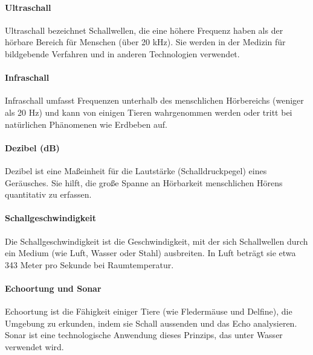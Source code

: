 \documentclass{vorlage-design-main}
\begin{document}
\hypertarget{ultraschall}{%
\paragraph{Ultraschall}\label{ultraschall}}

Ultraschall bezeichnet Schallwellen, die eine höhere Frequenz haben als
der hörbare Bereich für Menschen (über 20 kHz). Sie werden in der
Medizin für bildgebende Verfahren und in anderen Technologien verwendet.

\hypertarget{infraschall}{%
\paragraph{Infraschall}\label{infraschall}}

Infraschall umfasst Frequenzen unterhalb des menschlichen Hörbereichs
(weniger als 20 Hz) und kann von einigen Tieren wahrgenommen werden oder
tritt bei natürlichen Phänomenen wie Erdbeben auf.

\hypertarget{dezibel-db}{%
\paragraph{Dezibel (dB)}\label{dezibel-db}}

Dezibel ist eine Maßeinheit für die Lautstärke (Schalldruckpegel) eines
Geräusches. Sie hilft, die große Spanne an Hörbarkeit menschlichen
Hörens quantitativ zu erfassen.

\hypertarget{schallgeschwindigkeit}{%
\paragraph{Schallgeschwindigkeit}\label{schallgeschwindigkeit}}

Die Schallgeschwindigkeit ist die Geschwindigkeit, mit der sich
Schallwellen durch ein Medium (wie Luft, Wasser oder Stahl) ausbreiten.
In Luft beträgt sie etwa 343 Meter pro Sekunde bei Raumtemperatur.

\hypertarget{echoortung-und-sonar}{%
\paragraph{Echoortung und Sonar}\label{echoortung-und-sonar}}

Echoortung ist die Fähigkeit einiger Tiere (wie Fledermäuse und
Delfine), die Umgebung zu erkunden, indem sie Schall aussenden und das
Echo analysieren. Sonar ist eine technologische Anwendung dieses
Prinzips, das unter Wasser verwendet wird.
\end{document}
